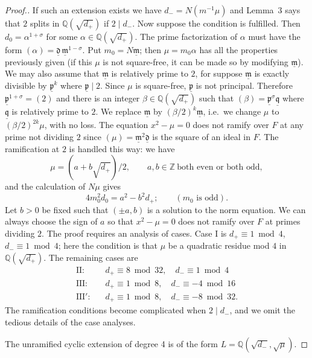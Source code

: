 \begin{proof}[Proof.]
If such an extension exists we have $d_{-}=N(m^{-1}\mu)$ and
Lemma~3 says that $2$ splits in $\mathbb{Q}(\sqrt{d_{+}})$ if
$2\mid d_{-}$. Now suppose the condition is fulfilled. Then
$d_{0}=\alpha^{1+\sigma}$ for some $\alpha\in\mathbb{Q}(\sqrt{d_{+}})$.
The prime factorization of $\alpha$ must have the form
$(\alpha)=\underline{\mathfrak{d}}\,\underline{\mathfrak{m}}^{1-\sigma}$.
Put $m_{0}=N\underline{\mathfrak{m}}$; then $\mu=m_{0}\alpha$ has all the
properties previously given (if this $\mu$ is not square-free, it can be
made so by modifying $\underline{\mathfrak{m}}$). We may also assume that
$\underline{\mathfrak{m}}$ is relatively prime to $2$, for suppose
$\underline{\mathfrak{m}}$ is exactly divisible by
$\underline{\mathfrak{p}}^{k}$ where $\underline{\mathfrak{p}}\mid 2$.
Since $\mu$ is square-free, $\underline{\mathfrak{p}}$ is not principal.
Therefore $\underline{\mathfrak{p}}^{1+\sigma}=(2)$ and there is an
integer $\beta\in\mathbb{Q}(\sqrt{d_{+}})$ such that
$(\beta)=\underline{\mathfrak{p}}^{\sigma}\underline{\mathfrak{q}}$
where $\underline{\mathfrak{q}}$ is relatively prime to $2$. We replace
$\underline{\mathfrak{m}}$ by $(\beta/2)^{k}\underline{\mathfrak{m}}$,
i.e.\ we change $\mu$ to $(\beta/2)^{2k}\mu$, with no loss. The equation
$x^{2}-\mu=0$ does not ramify over $F$ at any prime not dividing $2$
since $(\mu)=\underline{\mathfrak{m}}^{2}\underline{\mathfrak{d}}$ is the
square of an ideal in $F$. The ramification at $2$ is handled this way:
we have
\[
\mu=(a+b\sqrt{d_{+}})/2,\qquad a,b\in\mathbb{Z}\ \text{both even or both odd},
\]
and the calculation of $N\mu$ gives
\[
4m_{0}^{2}d_{0}=a^{2}-b^{2}d_{+};\qquad(m_{0}\text{ is odd}).
\]
Let $b>0$ be fixed such that $(\pm a,b)$ is a solution to the norm
equation. We can always choose the sign of $a$ so that $x^{2}-\mu=0$ does
not ramify over $F$ at primes dividing $2$. The proof requires an
analysis of cases. Case I is $d_{+}\equiv 1\bmod 4$, $d_{-}\equiv
1\bmod 4$; here the condition is that $\mu$ be a quadratic residue mod
$4$ in $\mathbb{Q}(\sqrt{d_{+}})$. The remaining cases are
\[
\begin{aligned}
\text{II:}&\quad d_{+}\equiv 8\bmod 32,\quad d_{-}\equiv 1\bmod 4\\
\text{III:}&\quad d_{+}\equiv 1\bmod 8,\quad d_{-}\equiv -4\bmod 16\\
\text{III$'$:}&\quad d_{+}\equiv 1\bmod 8,\quad d_{-}\equiv -8\bmod 32.
\end{aligned}
\]
The ramification conditions become complicated when $2\mid d_{-}$, and we
omit the tedious details of the case analyses.

The unramified cyclic extension of degree 4 is of the form
$L=\mathbb{Q}(\sqrt{d_{-}},\sqrt{\mu})$.
\end{proof}

